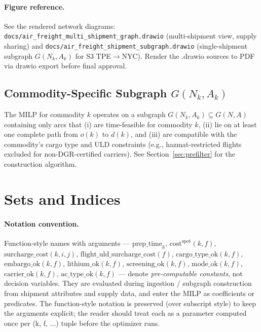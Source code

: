 \documentclass[11pt,a4paper]{article}
\theoremstyle{definition}
\begin{document}
\paragraph{Figure reference.}
See the rendered network diagrams: \texttt{docs/air\_freight\_multi\_shipment\_graph.drawio}
(multi-shipment view, supply sharing) and \texttt{docs/air\_freight\_shipment\_subgraph.drawio}
(single-shipment subgraph $G(N_k, A_k)$ for S3 TPE$\to$NYC). Render the .drawio sources to PDF
via drawio export before final approval.

\subsection{Commodity-Specific Subgraph \texorpdfstring{$G(N_k, A_k)$}{G(Nk,Ak)}}
\label{sec:subgraph}

The MILP for commodity $k$ operates on a subgraph $G(N_k, A_k) \subseteq G(N, A)$ containing
only arcs that (i) are time-feasible for commodity $k$, (ii) lie on at least one complete
path from $o(k)$ to $d(k)$, and (iii) are compatible with the commodity's cargo type and
ULD constraints (e.g., hazmat-restricted flights excluded for non-DGR-certified carriers).
See Section~\ref{sec:prefilter} for the construction algorithm.

\section{Sets and Indices}

\paragraph{Notation convention.}
Function-style names with arguments --- $\text{prep\_time}_k$,
$\text{cost}^{\text{spot}}(k,f)$, $\text{surcharge\_cost}(k,i,j)$,
$\text{flight\_uld\_surcharge\_cost}(f)$, $\text{cargo\_type\_ok}(k,f)$,
$\text{embargo\_ok}(k,f)$, $\text{lithium\_ok}(k,f)$, $\text{screening\_ok}(k,f)$,
$\text{mode\_ok}(k,f)$, $\text{carrier\_ok}(k,f)$, $\text{ac\_type\_ok}(k,f)$ ---
denote \emph{pre-computable constants}, not decision variables. They are evaluated
during ingestion / subgraph construction from shipment attributes and supply data,
and enter the MILP as coefficients or predicates. The function-style notation is
preserved (over subscript style) to keep the arguments explicit; the reader should
treat each as a parameter computed once per (k, f, ...) tuple before the optimizer
runs.
\end{document}
